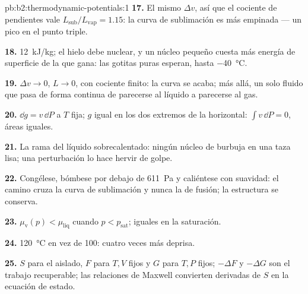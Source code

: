 \begin{solution}{pb:b2:thermodynamic-potentials:1}
\textbf{17.} El mismo $\Delta v$, así que el cociente de pendientes vale $L_{\text{sub}}/L_{\text{vap}}
= 1.15$: la curva de sublimación es más empinada --- un pico en el punto triple.

\textbf{18.} \qty{12}{kJ/kg}; el hielo debe nuclear, y un núcleo pequeño cuesta
más energía de superficie de la que gana: las gotitas puras esperan, hasta
\qty{-40}{\celsius}.

\textbf{19.} $\Delta v \to 0$, $L \to 0$, con cociente finito: la curva se acaba;
más allá, un solo fluido que pasa de forma continua de parecerse al líquido a parecerse al gas.

\textbf{20.} $\dd g = v\,\dd P$ a $T$ fija; $g$ igual en los dos extremos de
la horizontal: $\int v\,\dd P = 0$, áreas iguales.

\textbf{21.} La rama del líquido sobrecalentado: ningún núcleo de burbuja en una
taza lisa; una perturbación lo hace hervir de golpe.

\textbf{22.} Congélese, bómbese por debajo de \qty{611}{Pa} y caliéntese con suavidad: el camino
cruza la curva de sublimación y nunca la de fusión; la estructura
se conserva.

\textbf{23.} $\mu_{\text{v}}(p) < \mu_{\text{liq}}$ cuando $p < p_{\text{sat}}$; iguales en
la saturación.

\textbf{24.} \qty{120}{\celsius} en vez de \qty{100}{}: cuatro veces más deprisa.

\textbf{25.} $S$ para el aislado, $F$ para $T,V$ fijos y $G$ para $T,P$ fijos;
$-\Delta F$ y $-\Delta G$ son el trabajo recuperable; las relaciones de Maxwell convierten
derivadas de $S$ en la ecuación de estado.
\end{solution}
